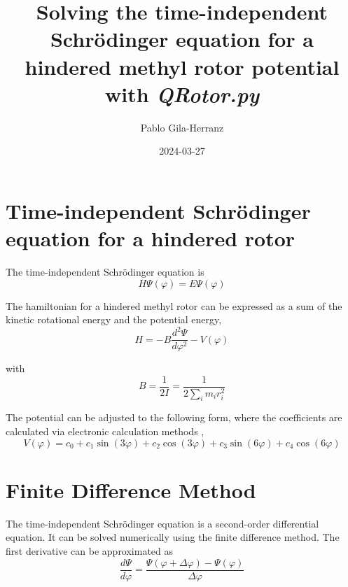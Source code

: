 \documentclass[12pt,a4paper]{article}
\title{Solving the time-independent Schrödinger equation for a hindered methyl rotor potential with \textit{QRotor.py}}
\author{Pablo Gila-Herranz}
\date{2024-03-27}
\begin{document}
\maketitle


\section*{Time-independent Schrödinger equation for a hindered rotor}

The time-independent Schrödinger equation is
$$
H\Psi(\varphi)=E\Psi(\varphi)
$$

The hamiltonian for a hindered methyl rotor can be expressed as a sum of the kinetic rotational energy and the potential energy,
$$
H = -B \frac{d^2\Psi}{d\varphi^2} - V(\varphi)
$$

with
$$
B = \frac{1}{2I}=\frac{1}{2\sum_{i}m_{i}r_{i}^{2}}
$$

The potential can be adjusted to the following form, where the coefficients are calculated via electronic calculation methods \cite{titov2023},
$$
V(\varphi)=c_{0}+c_{1}\sin(3\varphi)+c_{2}\cos(3\varphi)+c_{3}\sin(6\varphi)+c_{4}\cos(6\varphi)
$$


\section*{Finite Difference Method}

The time-independent Schrödinger equation is a second-order differential equation. It can be solved numerically using the finite difference method. The first derivative can be approximated as
$$
\frac{d\Psi}{d\varphi} = \frac{\Psi(\varphi+\Delta\varphi)-\Psi(\varphi)}{\Delta\varphi}
$$


\end{document}
